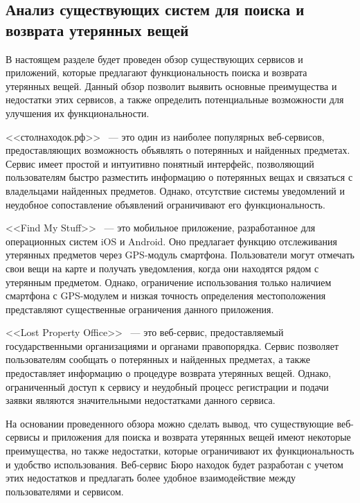 \subsection{Анализ существующих систем для поиска и возврата утерянных вещей}

В настоящем разделе будет проведен обзор существующих сервисов и приложений, которые предлагают функциональность поиска и возврата утерянных вещей. Данный обзор позволит выявить основные преимущества и недостатки этих сервисов, а также определить потенциальные возможности для улучшения их функциональности.

<<столнаходок.рф>>~\cite{bib:stol_nahodok} --- это один из наиболее популярных веб-сервисов, предоставляющих возможность объявлять о потерянных и найденных предметах. Сервис имеет простой и интуитивно понятный интерфейс, позволяющий пользователям быстро разместить информацию о потерянных вещах и связаться с владельцами найденных предметов. Однако, отсутствие системы уведомлений и неудобное сопоставление объявлений ограничивают его функциональность.

<<Find My Stuff>>~\cite{bib:find_my_stuff} --- это мобильное приложение, разработанное для операционных систем iOS и Android. Оно предлагает функцию отслеживания утерянных предметов через GPS-модуль смартфона. Пользователи могут отмечать свои вещи на карте и получать уведомления, когда они находятся рядом с утерянным предметом. Однако, ограничение использования только наличием смартфона с GPS-модулем и низкая точность определения местоположения представляют существенные ограничения данного приложения.

<<Lost Property Office>>~\cite{bib:parliament_lost_and_found} --- это веб-сервис, предоставляемый государственными организациями и органами правопорядка. Сервис позволяет пользователям сообщать о потерянных и найденных предметах, а также предоставляет информацию о процедуре возврата утерянных вещей. Однако, ограниченный доступ к сервису и неудобный процесс регистрации и подачи заявки являются значительными недостатками данного сервиса.

На основании проведенного обзора можно сделать вывод, что существующие веб-сервисы и приложения для поиска и возврата утерянных вещей имеют некоторые преимущества, но также недостатки, которые ограничивают их функциональность и удобство использования. Веб-сервис Бюро находок будет разработан с учетом этих недостатков и предлагать более удобное взаимодействие между пользователями и сервисом.

